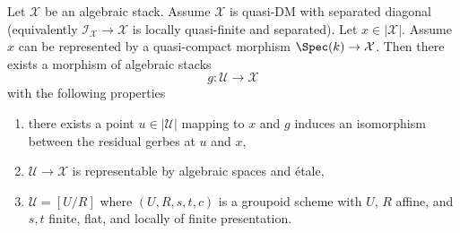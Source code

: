 \begin{lemma}
\label{lemma-etale-local-quasi-DM-at-x-inertia}
Let $\mathcal{X}$ be an algebraic stack. Assume $\mathcal{X}$ is
quasi-DM with separated diagonal (equivalently
$\mathcal{I}_\mathcal{X} \to \mathcal{X}$ is locally quasi-finite and
separated). Let $x \in |\mathcal{X}|$. Assume $x$ can be represented
by a quasi-compact morphism $\Spec(k) \to \mathcal{X}$.
Then there exists a morphism of algebraic stacks
$$
g : \mathcal{U} \longrightarrow \mathcal{X}
$$
with the following properties
\begin{enumerate}
\item there exists a point $u \in |\mathcal{U}|$ mapping to $x$ and
$g$ induces an isomorphism between the residual gerbes at $u$ and $x$,
\item $\mathcal{U} \to \mathcal{X}$ is representable by algebraic spaces and
\'etale,
\item $\mathcal{U} = [U/R]$ where $(U, R, s, t, c)$ is a groupoid
scheme with $U$, $R$ affine, and $s, t$ finite, flat, and
locally of finite presentation.
\end{enumerate}
\end{lemma}

